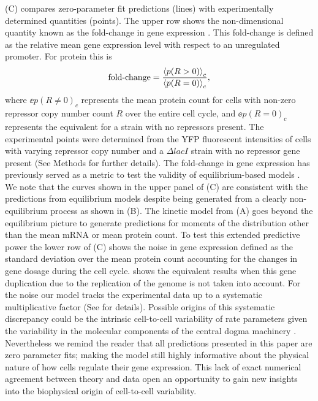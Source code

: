 (C) compares zero-parameter fit predictions (lines) with
experimentally determined quantities (points). The upper row shows the
non-dimensional quantity known as the fold-change in gene expression
\cite{Garcia2011c}. This fold-change is defined as the relative mean gene
expression level with respect to an unregulated promoter. For protein this is
\begin{equation}
	\text{fold-change} = {\left\langle p(R > 0) \right\rangle_c \over \left\langle p(R = 0) \right\rangle_c},
\end{equation}
where $\ee{p(R \neq 0)}_c$ represents the mean protein count for cells with
non-zero repressor copy number count $R$ over the entire cell cycle, and
$\ee{p(R = 0)}_c$ represents the equivalent for a strain with no repressors
present. The experimental points were determined from the YFP fluorescent
intensities of cells with varying repressor copy number and a $\Delta lacI$
strain with no repressor gene present (See Methods for further details). The
fold-change in gene expression has previously served as a metric to test the
validity of equilibrium-based models \cite{Phillips2015}. We note that the
curves shown in the upper panel of (C) are consistent
with the predictions from equilibrium models \cite{Razo-Mejia2018} despite
being generated from a clearly non-equilibrium process as shown in
(B). The kinetic model from (A)
goes beyond the equilibrium picture to generate predictions for moments of the
distribution other than the mean mRNA or mean protein count. To test this
extended predictive power the lower row of (C) shows the
noise in gene expression defined as the standard deviation over the mean
protein count accounting for the changes in gene dosage during the cell cycle.
 shows the equivalent results when this gene duplication
due to the replication of the genome is not taken into account. For the noise
our model tracks the experimental data up to a systematic multiplicative factor
(See  for details). Possible origins of this systematic
discrepancy could be the intrinsic cell-to-cell variability of rate parameters
given the variability in the molecular components of the central dogma
machinery \cite{Jones2014a}. Nevertheless we remind the reader that all
predictions presented in this paper are zero parameter fits; making the model
still highly informative about the physical nature of how cells regulate their
gene expression. This lack of exact numerical agreement between theory and data
open an opportunity to gain new insights into the biophysical origin of
cell-to-cell variability. 

